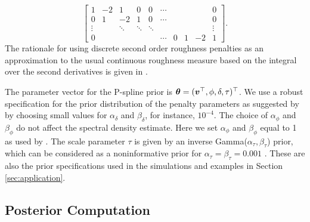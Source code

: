 \documentclass[twocolumn,final]{svjour3}
\newcommand{\bm}[1]{\mbox{\boldmath $#1$}}
\newcommand{\pmr}{ \color{red}}
\begin{document}
\begin{equation}\label{eq:D2}
\begin{bmatrix}
1 & -2 &  1 & 0 & 0 & \cdots & & & & 0 \\
0 & 1  & -2 & 1 & 0 & \cdots & & & & 0 \\
\vdots & & \ddots & \ddots & \ddots &&&&& \vdots \\
0 & &&&& \cdots & 0 & 1 & -2 & 1 
\end{bmatrix}.
\end{equation}
The rationale for using discrete second order roughness penalties as an approximation to the usual continuous roughness measure based on the integral over the second derivatives is given
in \cite{Eilers:1996}.

The parameter vector for the P-spline prior is $\bm{\theta} = (\bm{v}^\top, \phi, \delta, \tau)^\top$.
We use a robust specification for the  prior distribution of the penalty parameters as suggested by \cite{Jullion:2007} by choosing small values for $\alpha_{\delta}$ and $\beta_{\delta}$, for instance, $10^{-4}$. The  choice of $\alpha_{\phi}$ and $\beta_{\phi}$ do not affect the spectral density estimate. Here we set $\alpha_{\phi}$ and $\beta_{\phi}$ equal to 1 as used by \cite{Bremhorst:2016}. The scale parameter $\tau$ is given by an inverse Gamma($\alpha_{\tau},\beta_{\tau}$) prior, {\pmr which can be considered as a noninformative prior for $\alpha_{\tau} = \beta_{\tau} = 0.001$ \citep{Edwards2019}.}  These are also the prior specifications used in the simulations and examples in Section \ref{sec:application}.




\subsection*{Posterior Computation}
\end{document}
